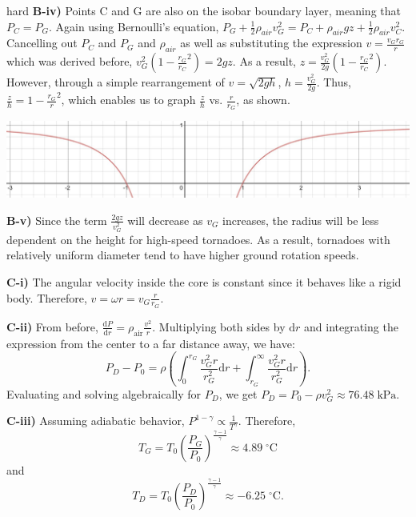 \begin{solution}{hard}
\noindent \textbf{B-iv)} Points C and G are also on the isobar boundary layer, meaning that $P_C = P_G$. Again using Bernoulli's equation, $P_G + \frac{1}{2}\rho_{air} v_G^2 = P_C + \rho_{air}gz + \frac{1}{2}\rho_{air}v_C^2$. Cancelling out $P_C$ and $P_G$ and $\rho_{air}$ as well as substituting the expression $v = \frac{v_Gr_G}{r}$ which was derived before, $v_G^2(1 - \frac{r_G}{r_C}^2) = 2gz$. As a result, $z = \frac{v_G^2}{2g}(1 - \frac{r_G}{r_C}^2)$. However, through a simple rearrangement of $v = \sqrt{2gh}$, $h = \frac{v_G^2}{2g}$. Thus, $\frac{z}{h} = 1 - \frac{r_G}{r}^2$, which enables us to graph $\frac{z}{h}$ vs. $\frac{r}{r_G}$, as shown.
\begin{center}
    \includegraphics[width=15cm]{graph.jpeg}
\end{center}
\vspace{3mm}

\noindent \textbf{B-v)}  Since the term $\frac{2gz}{v_G^2}$ will decrease as $v_G$ increases, the radius will be less dependent on the height for high-speed tornadoes. As a result, tornadoes with relatively uniform diameter tend to have higher ground rotation speeds.
\vspace{3mm}

\noindent \textbf{C-i)} The angular velocity inside the core is constant since it behaves like a rigid body. Therefore, $v = \omega r = v_G\frac{r}{r_G}$.
\vspace{3mm}

\noindent \textbf{C-ii)}  From before, $\frac{\mathrm{d}P}{\mathrm{d}r} = \rho_{\text{air}}\frac{v^2}{r}$. Multiplying both sides by $\mathrm{d}r$ and integrating the expression from the center to a far distance away, we have: 
\[P_D - P_0 = \rho \left(\int_{0}^{r_G}\frac{v_G^2r}{r_G^2} \mathrm{d}r + \int_{r_G}^{\infty}\frac{v_G^2r}{r_G^2} \mathrm{d}r\right).\]
Evaluating and solving algebraically for $P_D$, we get $P_D = P_0 - \rho v_G^2 \approx 76.48\;\mathrm{kPa}$.
\vspace{3mm}

\noindent \textbf{C-iii)} Assuming adiabatic behavior, $P^{1 - \gamma} \propto \frac{1}{T^\gamma}$. Therefore, $$T_G = T_0\left(\frac{P_G}{P_0}\right)^{\frac{\gamma - 1}{\gamma}} \approx 4.89\;\mathrm{^{\circ} C}$$ and $$T_D= T_0\left(\frac{P_D}{P_0}\right)^{\frac{\gamma - 1}{\gamma}} \approx -6.25\;\mathrm{^{\circ} C}.$$
\vspace{3mm}


\end{solution}
